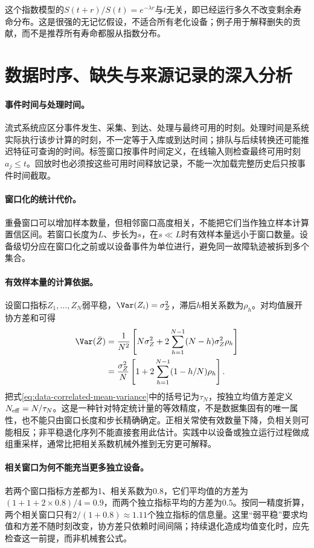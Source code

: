 这个指数模型的$S(t+r)/S(t)=e^{-\lambda r}$与$t$无关，即已经运行多久不改变剩余寿命分布。这是很强的无记忆假设，不适合所有老化设备；例子用于解释删失的贡献，而不是推荐所有寿命都服从指数分布。

\section{数据时序、缺失与来源记录的深入分析}
\paragraph{事件时间与处理时间。}
流式系统应区分事件发生、采集、到达、处理与最终可用的时刻。处理时间是系统实际执行该步计算的时刻，不一定等于入库或到达时间；排队与后续转换还可能推迟特征可查询的时间。标签窗口按事件时间定义，在线输入则检查最终可用时刻$a_j\leq t$。回放时也必须按这些可用时间释放记录，不能一次加载完整历史后只按事件时间截取。

\paragraph{窗口化的统计代价。}
重叠窗口可以增加样本数量，但相邻窗口高度相关，不能把它们当作独立样本计算置信区间。若窗口长度为$L$、步长为$s$，在$s\ll L$时有效样本量远小于窗口数量。设备级切分应在窗口化之前或以设备事件为单位进行，避免同一故障轨迹被拆到多个集合。

\paragraph{有效样本量的计算依据。}
设窗口指标$Z_1,\ldots,Z_N$弱平稳，$\Var(Z_i)=\sigma_Z^2$，滞后$h$相关系数为$\rho_h$。对均值展开协方差和可得
\begin{align}
 \Var(\bar Z)
 &=\frac1{N^2}\left[N\sigma_Z^2+2\sum_{h=1}^{N-1}(N-h)\sigma_Z^2\rho_h\right]\\
 &=\frac{\sigma_Z^2}{N}\left[1+2\sum_{h=1}^{N-1}(1-h/N)\rho_h\right].\label{eq:data-correlated-mean-variance}
\end{align}
把式\eqref{eq:data-correlated-mean-variance}中的括号记为$\tau_N$，按独立均值方差定义$N_{\rm eff}=N/\tau_N$。这是一种针对特定统计量的等效精度，不是数据集固有的唯一属性，也不能只由窗口长度和步长精确确定。正相关常使有效数量下降，负相关则可能相反；非平稳退化序列不能直接套用此估计。实践中以设备或独立运行过程做成组重采样，通常比把相关系数机械外推到无穷更可解释。

\paragraph{相关窗口为何不能充当更多独立设备。}
若两个窗口指标方差都为1、相关系数为$0.8$，它们平均值的方差为$(1+1+2\times0.8)/4=0.9$，而两个独立指标平均的方差为$0.5$。按同一精度折算，两个相关窗口只有$2/(1+0.8)\approx1.11$个独立指标的信息量。这里“弱平稳”要求均值和方差不随时刻改变，协方差只依赖时间间隔；持续退化造成均值变化时，应先检查这一前提，而非机械套公式。

